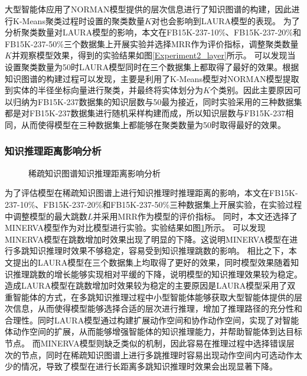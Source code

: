 \documentclass[algorithmlist, AutoFakeBold, AutoFakeSlant, figurelist, tablelist, nomlist, engineering, openany]{seuthesix} %
\begin{document}
大型智能体应用了NORMAN模型提供的层次信息进行了知识图谱的构建，因此进行K-Means聚类过程时设置的聚类数量$K$对也会影响到LAURA模型的表现。
为了分析聚类数量对LAURA模型的影响，本文在FB15K-237-10\%、FB15K-237-20\%和FB15K-237-50\%三个数据集上开展实验并选择MRR作为评价指标，调整聚类数量$K$并观察模型效果，得到的实验结果如图\ref{Experiment2_layer}所示。
可以发现当设置聚类数量为50时LAURA模型同时在三个数据集上都取得了最好的效果。根据知识图谱的构建过程可以发现，主要是利用了K-Means模型对NORMAN模型提取到实体的半径坐标向量进行聚类，并最终将实体划分为$K$个类别。因此主要原因可以归纳为FB15K-237数据集的知识层数与50最为接近，同时实验采用的三种数据集都是对FB15K-237数据集进行随机采样构建而成，所以知识层数与FB15K-237相同，从而使得模型在三种数据集上都能够在聚类数量为50时取得最好的效果。

\subsubsection{知识推理距离影响分析}
\begin{figure}[t]
  \centering
  \caption{稀疏知识图谱知识推理距离影响分析}
  \label{Experiment2_multihop}
\end{figure}

为了评估模型在稀疏知识图谱上进行知识推理时推理距离的影响，本文在FB15K-237-10\%、FB15K-237-20\%和FB15K-237-50\%三种数据集上开展实验，在实验过程中调整模型的最大跳数$L$并采用MRR作为模型的评价指标。
同时，本文还选择了MINERVA模型作为对比模型进行实验。实验结果如图\ref{Experiment2_multihop}所示。
可以发现MINERVA模型在跳数增加时效果出现了明显的下降。这说明MINERVA模型在进行多跳知识推理时效果不够稳定，容易受到知识推理跳数的影响。
相比之下，本文提出的LAURA模型在三个数据集上均取得了更好的效果，同时模型效果随着知识推理跳数的增长能够实现相对平缓的下降，说明模型的知识推理效果较为稳定。
造成LAURA模型在跳数增加时效果较为稳定的主要原因是LAURA模型采用了双重智能体的方式，在多跳知识推理过程中小型智能体能够获取大型智能体提供的层次信息，从而使得模型能够选择合适的层次进行推理，增加了推理路径的充分性和合理性。同时LAURA模型通过构建扩展动作空间和协作动作空间，实现了对智能体动作空间的扩展，从而能够增强智能体的知识推理能力，并帮助智能体到达目标节点。
而MINERVA模型则缺乏类似的机制，因此容易在推理过程中选择错误层次的节点，同时在稀疏知识图谱上进行多跳推理时容易出现动作空间内可选动作太少的情况，导致了模型在进行长距离多跳知识推理时效果会出现显著下降。
\end{document}
